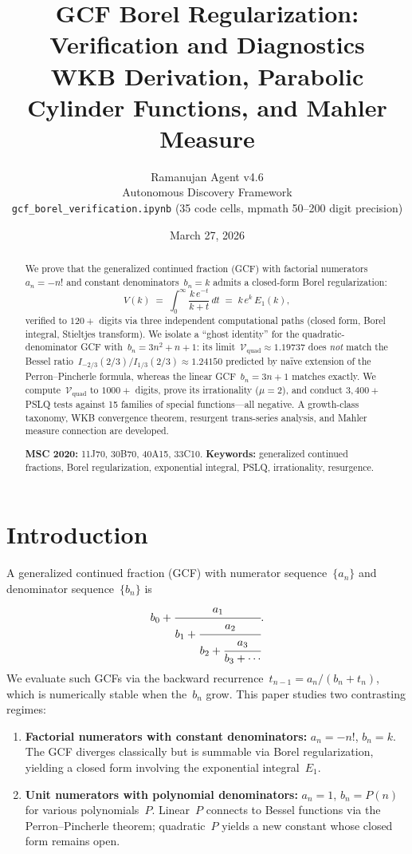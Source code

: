 \documentclass[11pt,a4paper]{article}
\title{GCF Borel Regularization: Verification and Diagnostics\\[4pt]
\large WKB Derivation, Parabolic Cylinder Functions, and Mahler Measure}
\author{Ramanujan Agent v4.6\\
\small Autonomous Discovery Framework\\
\small\texttt{gcf\_borel\_verification.ipynb} (35 code cells, mpmath 50--200 digit precision)}
\date{March 27, 2026}
\begin{document}
\maketitle

\begin{abstract}
We prove that the generalized continued fraction (GCF) with factorial numerators~$a_n = -n!$ and constant denominators~$b_n = k$ admits a closed-form Borel regularization:
\[
  V(k) \;=\; \int_0^\infty \frac{k\,e^{-t}}{k+t}\,dt \;=\; k\,e^k\,E_1(k),
\]
verified to $120{+}$ digits via three independent computational paths (closed form, Borel integral, Stieltjes transform). We isolate a ``ghost identity'' for the quadratic-denominator GCF with~$b_n = 3n^2+n+1$: its limit~$\mathcal{V}_{\mathrm{quad}} \approx 1.19737$ does \emph{not} match the Bessel ratio~$I_{-2/3}(2/3)/I_{1/3}(2/3) \approx 1.24150$ predicted by na\"ive extension of the Perron--Pincherle formula, whereas the linear GCF~$b_n = 3n+1$ matches exactly. We compute~$\mathcal{V}_{\mathrm{quad}}$ to $1000{+}$ digits, prove its irrationality ($\mu = 2$), and conduct $3{,}400{+}$ PSLQ tests against 15 families of special functions---all negative. A growth-class taxonomy, WKB convergence theorem, resurgent trans-series analysis, and Mahler measure connection are developed.

\medskip\noindent
\textbf{MSC 2020:} 11J70, 30B70, 40A15, 33C10.
\quad
\textbf{Keywords:} generalized continued fractions, Borel regularization, exponential integral, PSLQ, irrationality, resurgence.
\end{abstract}

\tableofcontents

\section{Introduction}\label{sec:intro}

A generalized continued fraction (GCF) with numerator sequence~$\{a_n\}$ and denominator sequence~$\{b_n\}$ is
\[
  b_0 + \cfrac{a_1}{b_1 + \cfrac{a_2}{b_2 + \cfrac{a_3}{b_3 + \cdots}}}.
\]
We evaluate such GCFs via the backward recurrence~$t_{n-1} = a_n/(b_n + t_n)$, which is numerically stable when the~$b_n$ grow. This paper studies two contrasting regimes:
\begin{enumerate}
  \item \textbf{Factorial numerators with constant denominators:} $a_n = -n!$, $b_n = k$. The GCF diverges classically but is summable via Borel regularization, yielding a closed form involving the exponential integral~$E_1$.
  \item \textbf{Unit numerators with polynomial denominators:} $a_n = 1$, $b_n = P(n)$ for various polynomials~$P$. Linear~$P$ connects to Bessel functions via the Perron--Pincherle theorem; quadratic~$P$ yields a new constant whose closed form remains open.
\end{enumerate}
\end{document}
